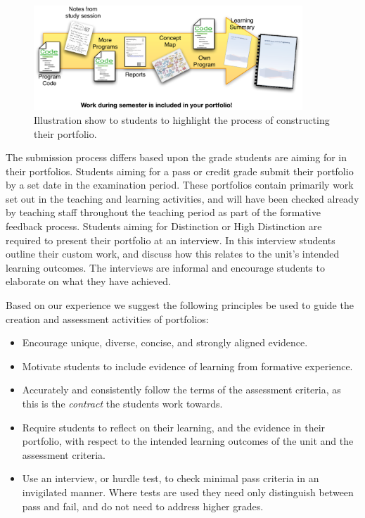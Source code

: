 \begin{figure}[p]
	\centering
	\includegraphics[width=0.9\textwidth]{PortfolioPieces}
	\caption{Illustration show to students to highlight the process of constructing their portfolio.}
	\label{fig:portfolio_pieces}
\end{figure}

The submission process differs based upon the grade students are aiming for in their portfolios. Students aiming for a pass or credit grade submit their portfolio by a set date in the examination period. These portfolios contain primarily work set out in the teaching and learning activities, and will have been checked already by teaching staff throughout the teaching period as part of the formative feedback process. Students aiming for Distinction or High Distinction are required to present their portfolio at an interview. In this interview students outline their custom work, and discuss how this relates to the unit's intended learning outcomes. The interviews are informal and encourage students to elaborate on what they have achieved.

Based on our experience we suggest the following principles be used to guide the creation and assessment activities of portfolios:
\begin{itemize}[noitemsep,nolistsep]
  \item Encourage unique, diverse, concise, and strongly aligned evidence.
  \item Motivate students to include evidence of learning from formative experience.
  \item Accurately and consistently follow the terms of the assessment criteria, as this is the \emph{contract} the students work towards.
  \item Require students to reflect on their learning, and the evidence in their portfolio, with respect to the intended learning outcomes of the unit and the assessment criteria.
  \item Use an interview, or hurdle test, to check minimal pass criteria in an invigilated manner. Where tests are used they need only distinguish between pass and fail, and do not need to address higher grades. 
\end{itemize}

